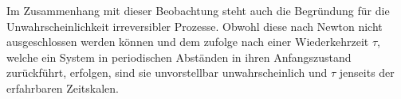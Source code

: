 \begin{summary}
    Im Zusammenhang mit dieser Beobachtung steht auch die Begründung für die Unwahrscheinlichkeit irreversibler Prozesse. Obwohl diese nach Newton nicht ausgeschlossen werden können und dem  zufolge nach einer Wiederkehrzeit $\tau$, welche ein System in periodischen Abständen in ihren Anfangszustand zurückführt, erfolgen, sind sie unvorstellbar unwahrscheinlich und $\tau$ jenseits der erfahrbaren Zeitskalen.
\end{summary}
